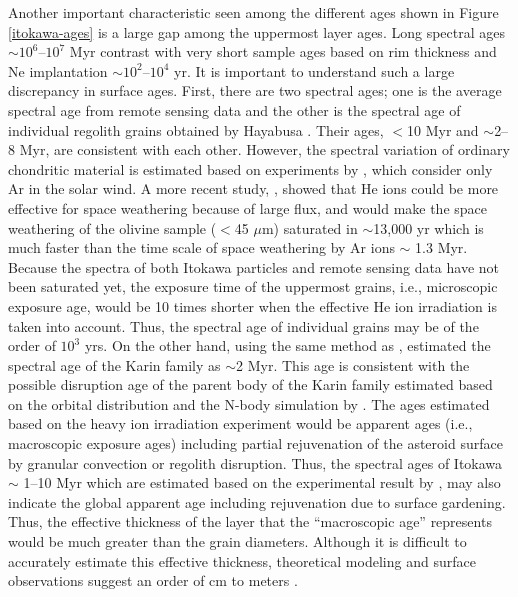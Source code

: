 \documentclass[3p,authoryear]{elsarticle}
\begin{document}
Another important characteristic seen among the different ages shown in Figure \ref{itokawa-ages} is a large gap among the uppermost layer ages. Long spectral ages $\sim 10^6$--$10^7$ Myr contrast with very short sample ages based on rim thickness and Ne implantation $\sim 10^2$--$10^4$ yr. It is important to understand such a large discrepancy in surface ages. First, there are two spectral ages; one is the average spectral age from remote sensing data \citep{koga2014} and the other is the spectral age of individual regolith grains obtained by Hayabusa \citep{bonal2015}. Their ages, $<$10 Myr and $\sim$2--8 Myr, are consistent with each other. However, the spectral variation of ordinary chondritic material is estimated based on experiments by \citet{strazzulla2005}, which consider only Ar in the solar wind. A more recent study, \citet{loeffler2009}, showed that He ions could be more effective for space weathering because of large flux, and would make the space weathering of the olivine sample ($<$45 $\mu$m) saturated in $\sim$13,000 yr which is much faster than the time scale of space weathering by Ar ions $\sim$ 1.3 Myr. Because the spectra of both Itokawa particles and remote sensing data have not been saturated yet, the exposure time of the uppermost grains, i.e., microscopic exposure age, would be 10 times shorter when the effective He ion irradiation is taken into account. Thus, the spectral age of individual grains may be of the order of $10^3$ yrs. On the other hand, using the same method as \citet{bonal2015}, \citet{brunetto2006b} estimated the spectral age of the Karin family as $\sim$2 Myr. This age is consistent with the possible disruption age of the parent body of the Karin family estimated based on the orbital distribution and the N-body simulation by \citet{nesvorny2002}. The ages estimated based on the heavy ion irradiation experiment \citep{strazzulla2005} would be apparent ages (i.e., macroscopic exposure ages) including partial rejuvenation of the asteroid surface by granular convection or regolith disruption. Thus, the spectral ages of Itokawa $\sim$ 1--10 Myr \citep{koga2014,bonal2015} which are estimated based on the experimental result by \citet{strazzulla2005}, may also indicate the global apparent age including rejuvenation due to surface gardening. Thus, the effective thickness of the layer that the “macroscopic age” represents would be much greater than the grain diameters. Although it is difficult to accurately estimate this effective thickness, theoretical modeling and surface observations suggest an order of cm to meters \citep{tancredi2012, yamada2016}.
\end{document}
